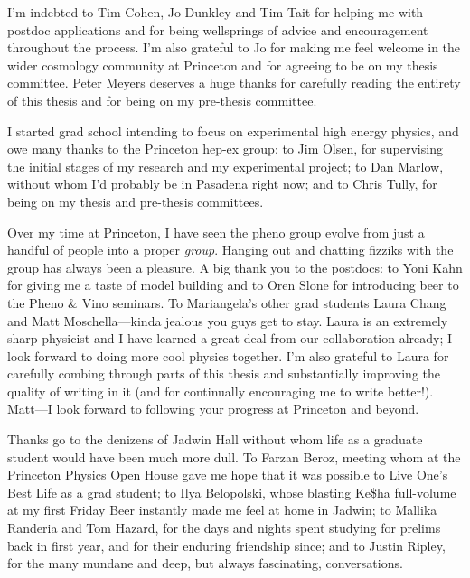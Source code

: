I'm indebted to Tim Cohen, Jo Dunkley and Tim Tait for helping me with postdoc applications and for being wellsprings of advice and encouragement throughout the process. I'm also grateful to Jo for making me feel welcome in the wider cosmology community at Princeton and for agreeing to be on my thesis committee. Peter Meyers deserves a huge thanks for carefully reading the entirety of this thesis and for being on my pre-thesis committee. 

I started grad school intending to focus on experimental high energy physics, and owe many thanks to the Princeton hep-ex group: to Jim Olsen, for supervising the initial stages of my research and my experimental project; to Dan Marlow, without whom I'd probably be in Pasadena right now; and to Chris Tully, for being on my thesis and pre-thesis committees. 

Over my time at Princeton, I have seen the pheno group evolve from just a handful of people into a proper \emph{group}. Hanging out and chatting fizziks with the group has always been a pleasure. A big thank you to the postdocs: to Yoni Kahn for giving me a taste of model building and to Oren Slone for introducing beer to the Pheno \& Vino seminars. To Mariangela's other grad students Laura Chang and Matt Moschella---kinda jealous you guys get to stay. Laura is an extremely sharp physicist and I have learned a great deal from our collaboration already; I look forward to doing more cool physics together. I'm also grateful to Laura for carefully combing through parts of this thesis and substantially improving the quality of writing in it (and for continually encouraging me to write better!). Matt---I look forward to following your progress at Princeton and beyond.

Thanks go to the denizens of Jadwin Hall without whom life as a graduate student would have been much more dull. To Farzan Beroz, meeting whom at the Princeton Physics Open House gave me hope that it was possible to Live One's Best Life as a grad student; to Ilya Belopolski, whose blasting Ke\$ha full-volume at my first Friday Beer instantly made me feel at home in Jadwin; to Mallika Randeria and Tom Hazard, for the days and nights spent studying for prelims back in first year, and for their enduring friendship since; and to Justin Ripley, for the many mundane and deep, but always fascinating, conversations. 

